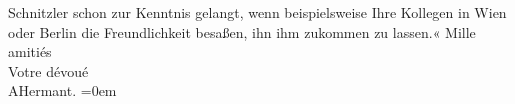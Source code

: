 \begin{ledgroupsized}[t]{13cm}
{{{                        Schnitzler schon zur Kenntnis gelangt,
                     wenn beispielsweise Ihre Kollegen in Wien
                     oder Berlin die Freundlichkeit besaßen, ihn
                     ihm zukommen zu lassen.«}}}\label{K_L02778-11h}\pend
           \pstart
           Mille amitiés{\\[\baselineskip]} Votre dévoué{\\[\baselineskip]}\spacefill\mbox{AHermant.}\pend
           \leftskip=0em{}
         
         \endnumbering{}\end{ledgroupsized}  \newcommand{\dateiname}{L02778}\newcommand{\titel}{Paul Goldmann an Arthur Schnitzler, 22. 6. [1896]}\newcommand{\editorInnen}{Martin Anton Müller und Laura Untner}
      